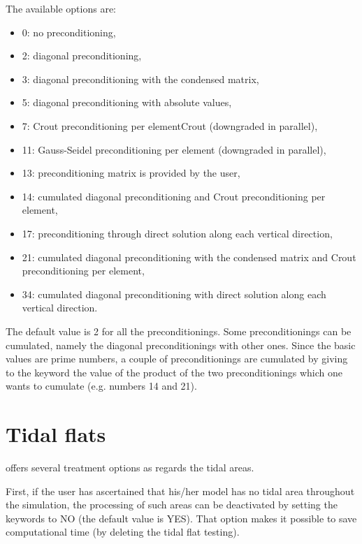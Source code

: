 The available options are:

\begin{itemize}
\item 0:  no preconditioning,

\item 2:  diagonal preconditioning,

\item 3:  diagonal preconditioning with the condensed matrix,

\item 5:  diagonal preconditioning with absolute values,

\item 7:  Crout preconditioning per elementCrout (downgraded in parallel),

\item 11: Gauss-Seidel preconditioning per element (downgraded in parallel),

\item 13: preconditioning matrix is provided by the user,

\item 14: cumulated diagonal preconditioning and Crout preconditioning per
element,

\item 17:  preconditioning through direct solution along each vertical
direction,

\item 21:  cumulated diagonal preconditioning with the condensed matrix and
Crout preconditioning per element,

\item 34:  cumulated diagonal preconditioning with direct solution along each
vertical direction.
\end{itemize}

The default value is 2 for all the preconditionings. Some preconditionings can
be cumulated, namely the diagonal preconditionings with other ones. Since the
basic values are prime numbers, a couple of preconditionings are cumulated by
giving to the keyword the value of the product of the two preconditionings
which one wants to cumulate (e.g. numbers 14 and 21).

\section{Tidal flats}

 offers several treatment options as regards the tidal areas.

First, if the user has ascertained that his/her model has no tidal area
throughout the simulation, the processing of such areas can be deactivated by
setting the keywords  to NO (the default value is YES).
That option makes it possible to save computational time (by deleting the tidal
flat testing).

